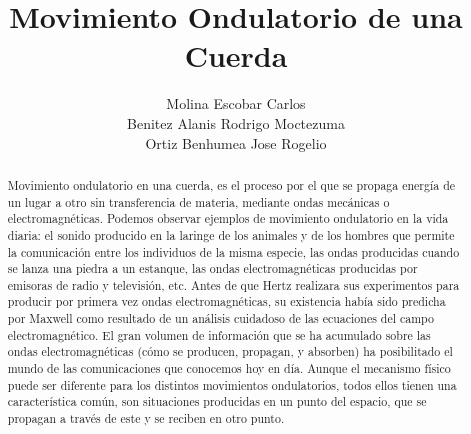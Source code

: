 \documentclass[11pt]{article}
\title{Movimiento Ondulatorio de una Cuerda}
\author{Molina Escobar Carlos\\Benitez Alanis Rodrigo Moctezuma\\Ortiz Benhumea Jose Rogelio}
\date{}
\begin{document}
\maketitle

\begin{abstract}

	 Movimiento ondulatorio en una cuerda, es el proceso por el que se propaga energía de un lugar a otro sin transferencia de materia, mediante ondas mecánicas o electromagnéticas.
	Podemos observar ejemplos de movimiento ondulatorio en la vida diaria: el sonido producido en la laringe de los animales y de los hombres que permite la comunicación entre los individuos de la misma especie, las ondas producidas cuando se lanza una piedra a un estanque, las ondas electromagnéticas producidas por emisoras de radio y televisión, etc.
	Antes de que Hertz realizara sus experimentos para producir por primera vez ondas electromagnéticas, su existencia había sido predicha por Maxwell como resultado de un análisis cuidadoso de las ecuaciones del campo electromagnético. El gran volumen de información que se ha acumulado sobre las ondas electromagnéticas (cómo se producen, propagan, y absorben) ha posibilitado el mundo de las comunicaciones que conocemos hoy en día.
	Aunque el mecanismo físico puede ser diferente para los distintos movimientos ondulatorios, todos ellos tienen una característica común, son situaciones producidas en un punto del espacio, que se propagan a través de este y se reciben en otro punto.

\end{abstract}
\end{document}
